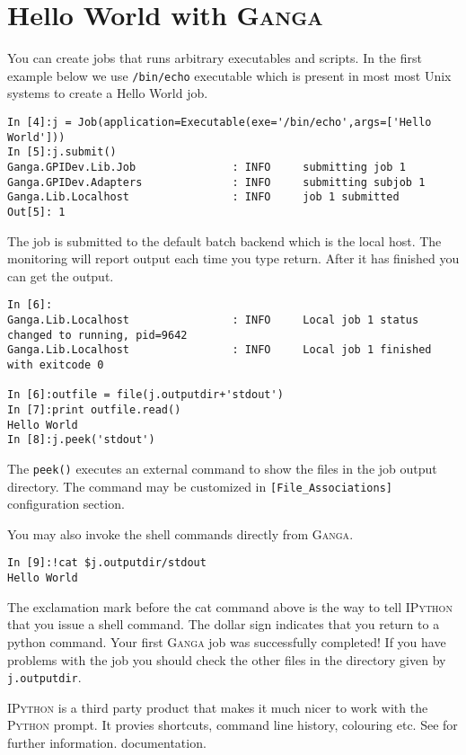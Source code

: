 \documentclass{howto}
\def\ganga {\textsc{Ganga}\xspace}
\def\python {\textsc{Python}\xspace}
\def\ipython {\textsc{IPython}\xspace}
\begin{document}
\section{Hello World with \ganga}
You can create jobs that runs arbitrary executables and scripts. In the first
example below we use \texttt{/bin/echo} executable which is present in most
most Unix systems to create a Hello World job.
\begin{verbatim}
In [4]:j = Job(application=Executable(exe='/bin/echo',args=['Hello World']))
In [5]:j.submit()
Ganga.GPIDev.Lib.Job               : INFO     submitting job 1
Ganga.GPIDev.Adapters              : INFO     submitting subjob 1
Ganga.Lib.Localhost                : INFO     job 1 submitted
Out[5]: 1
\end{verbatim}
The job is submitted to the default batch backend which is the local host. The
monitoring will report output each time you type return. After it has finished
you can get the output.
\begin{verbatim}
In [6]:
Ganga.Lib.Localhost                : INFO     Local job 1 status changed to running, pid=9642
Ganga.Lib.Localhost                : INFO     Local job 1 finished with exitcode 0

In [6]:outfile = file(j.outputdir+'stdout')
In [7]:print outfile.read()
Hello World
In [8]:j.peek('stdout')
\end{verbatim}

The \texttt{peek()} executes an external command to show the files in
the job output directory. The command may be customized in
\texttt{[File_Associations]} configuration section.

You may also invoke the shell commands directly from \ganga.

\begin{verbatim}
In [9]:!cat $j.outputdir/stdout
Hello World
\end{verbatim}
The exclamation mark before the cat command above is the way to tell \ipython
that you issue a shell command. The dollar sign indicates that you return to a
python command.  Your first \ganga job was successfully completed!  If you
have problems with the job you should check the other files in the directory
given by \texttt{j.outputdir}.

\begin{seealso}
  \ipython is a third party product that makes it much nicer to work with the
  \python prompt. It provies shortcuts, command line history, colouring etc.
  See  for further information.
  documentation.
\end{seealso}
\end{document}
